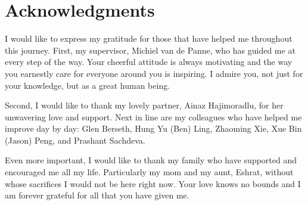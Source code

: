 
\chapter{Acknowledgments}

I would like to express my gratitude for those that have helped me throughout this journey. First, my supervisor, Michiel van de Panne, who has guided me at every step of the way. Your cheerful attitude is always motivating and the way you earnestly care for everyone around you is inspiring. I admire you, not just for your knowledge, but as a great human being.

Second, I would like to thank my lovely partner, Ainaz Hajimoradlu, for her unwavering love and support. Next in line are my colleagues who have helped me improve day by day: Glen Berseth, Hung Yu (Ben) Ling, Zhaoming Xie, Xue Bin (Jason) Peng, and Prashant Sachdeva.

Even more important, I would like to thank my family who have supported and encouraged me all my life. Particularly my mom and my aunt, Eshrat, without whose sacrifices I would not be here right now. Your love knows no bounds and I am forever grateful for all that you have given me.